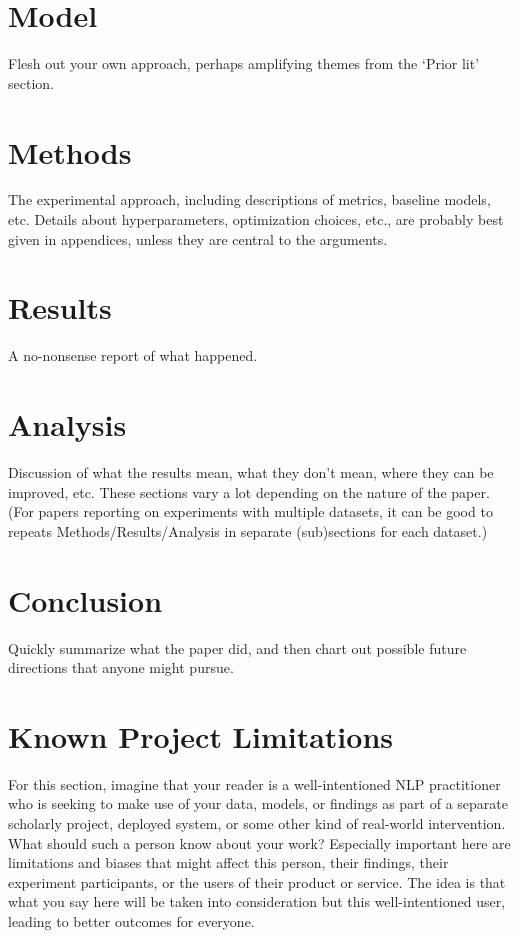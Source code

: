 \documentclass[11pt]{article}
\begin{document}
\section{Model}

Flesh out your own approach, perhaps amplifying themes from the `Prior lit' section.

\section{Methods}

The experimental approach, including descriptions of metrics, baseline models, etc. Details about hyperparameters, optimization choices, etc., are probably best given in appendices, unless they are central to the arguments.

\section{Results} 

A no-nonsense report of what happened.

\section{Analysis} 

Discussion of what the results mean, what they don’t mean, where they can be improved, etc. These sections vary a lot depending on the nature of the paper. (For papers reporting on experiments with multiple datasets, it can be good to repeats Methods/Results/Analysis in separate (sub)sections for each dataset.)

\section{Conclusion} 

Quickly summarize what the paper did, and then chart out possible future directions that anyone might pursue.

\section*{Known Project Limitations}

For this section, imagine that your reader is a well-intentioned NLP practitioner who is seeking to make use of your data, models, or findings as part of a separate scholarly project, deployed system, or some other kind of real-world intervention. What should such a person know about your work? Especially important here are limitations and biases that might affect this person, their findings, their experiment participants, or the users of their product or service. The idea is that what you say here will be taken into consideration but this well-intentioned user, leading to better outcomes for everyone.
\end{document}

